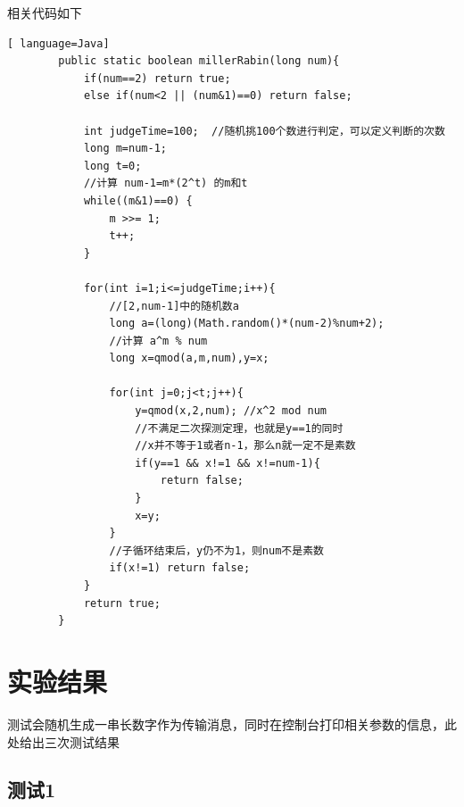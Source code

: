 \documentclass[UTF8,a4paper,10.5pt,twocolumn]{ctexart}
\begin{document}
	\par 相关代码如下
	\begin{lstlisting}[ language=Java]
		public static boolean millerRabin(long num){
    		if(num==2) return true;
    		else if(num<2 || (num&1)==0) return false;

    		int judgeTime=100;  //随机挑100个数进行判定，可以定义判断的次数
		    long m=num-1;
		    long t=0;
		    //计算 num-1=m*(2^t) 的m和t
		    while((m&1)==0) {
		        m >>= 1;
		        t++;
		    }

		    for(int i=1;i<=judgeTime;i++){
		        //[2,num-1]中的随机数a
		        long a=(long)(Math.random()*(num-2)%num+2);
		        //计算 a^m % num
		        long x=qmod(a,m,num),y=x;
		
		        for(int j=0;j<t;j++){
		            y=qmod(x,2,num); //x^2 mod num
		            //不满足二次探测定理，也就是y==1的同时
					//x并不等于1或者n-1，那么n就一定不是素数
		            if(y==1 && x!=1 && x!=num-1){
		                return false;
		            }
		            x=y;
		        }
		        //子循环结束后，y仍不为1，则num不是素数
		        if(x!=1) return false;
		    }
		    return true;
		}
	\end{lstlisting}

\section{实验结果}
	\par 测试会随机生成一串长数字作为传输消息，同时在控制台打印相关参数的信息，此处给出三次测试结果
	\subsection{测试1}
\end{document}
